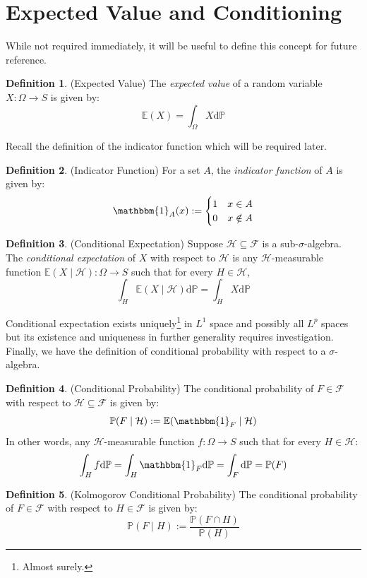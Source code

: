 \documentclass[a4paper,11pt,oneside]{book}
\theoremstyle{plain}
\theoremstyle{definition}
\newtheorem{defn}{Definition}[section]
\begin{document}
\section{Expected Value and Conditioning}
While not required immediately, it will be useful to define this concept for future reference.
\begin{defn}{(Expected Value)} The \emph{expected value} of a random variable $X:\Omega \rightarrow S$ is given by: \[\mathbb{E}(X) = \int_\Omega X\mathrm{d}\mathbb{P}\]
\end{defn}
Recall the definition of the indicator function which will be required later.
\begin{defn}{(Indicator Function)} For a set $A$, the \emph{indicator function} of $A$ is given by:
\[\mathbbm{1}_A(x):=\begin{cases} 1 & x \in A\\ 0 & x \notin A \end{cases}\]
\end{defn}
\begin{defn}{(Conditional Expectation)}
Suppose $\mathcal{H} \subseteq \mathcal{F}$ is a sub-$\sigma$-algebra. The \emph{conditional expectation} of $X$ with respect to $\mathcal{H}$ is any $\mathcal{H}$-measurable function $\mathbb{E}(X\mid \mathcal{H}):\Omega \rightarrow S$ such that for every $H \in \mathcal{H}$,
\[\int_H \mathbb{E}(X\mid \mathcal{H})\mathrm{d}\mathbb{P} = \int_H X\mathrm{d}\mathbb{P}\]
\end{defn}
Conditional expectation exists uniquely\footnote{Almost surely.} in $L^1$ space and possibly all $L^p$ spaces but its existence and uniqueness in further generality requires investigation. Finally, we have the definition of conditional probability with respect to a $\sigma$-algebra.
\begin{defn}{(Conditional Probability)} The conditional probability of $F \in \mathcal{F}$ with respect to $\mathcal{H} \subseteq \mathcal{F}$ is given by: \[\mathbb{P}(F \mid \mathcal{H}) := \mathbb{E}(\mathbbm{1}_F \mid \mathcal{H})\] In other words, any $\mathcal{H}$-measurable function $f:\Omega \rightarrow S$ such that for every $H \in \mathcal{H}$:
\[\int_H f\mathrm{d}\mathbb{P} = \int_H \mathbbm{1}_F\mathrm{d}\mathbb{P}=\int_F\mathrm{d}\mathbb{P}=\mathbb{P}(F)\]
\end{defn}
\begin{defn}{(Kolmogorov Conditional Probability)}
The conditional probability of $F \in \mathcal{F}$ with respect to $H \in \mathcal{F}$ is given by:
\[\mathbb{P}(F\mid H):= \frac{\mathbb{P}(F \cap H)}{\mathbb{P}(H)}\]
\end{defn}
\end{document}
